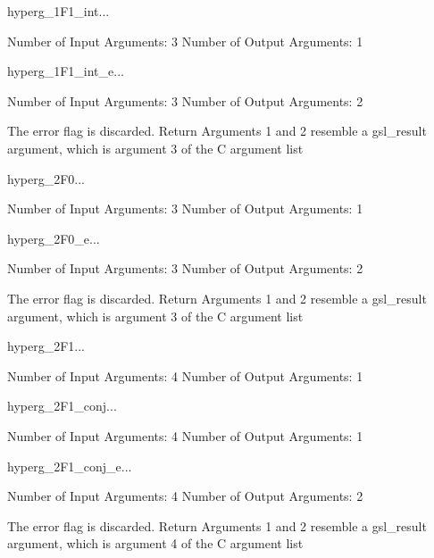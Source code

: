 \begin{funcdesc}{hyperg_1F1_int}{...}

    Number of Input  Arguments:  3
    Number of Output Arguments:  1
\end{funcdesc}

\begin{funcdesc}{hyperg_1F1_int_e}{...}

    Number of Input  Arguments:  3
    Number of Output Arguments:  2

The error flag is discarded.
Return Arguments 1 and 2 resemble a gsl_result argument,
	which is  argument 3 of the C argument list

\end{funcdesc}

\begin{funcdesc}{hyperg_2F0}{...}

    Number of Input  Arguments:  3
    Number of Output Arguments:  1
\end{funcdesc}

\begin{funcdesc}{hyperg_2F0_e}{...}

    Number of Input  Arguments:  3
    Number of Output Arguments:  2

The error flag is discarded.
Return Arguments 1 and 2 resemble a gsl_result argument,
	which is  argument 3 of the C argument list

\end{funcdesc}

\begin{funcdesc}{hyperg_2F1}{...}

    Number of Input  Arguments:  4
    Number of Output Arguments:  1
\end{funcdesc}

\begin{funcdesc}{hyperg_2F1_conj}{...}

    Number of Input  Arguments:  4
    Number of Output Arguments:  1
\end{funcdesc}

\begin{funcdesc}{hyperg_2F1_conj_e}{...}

    Number of Input  Arguments:  4
    Number of Output Arguments:  2

The error flag is discarded.
Return Arguments 1 and 2 resemble a gsl_result argument,
	which is  argument 4 of the C argument list

\end{funcdesc}

